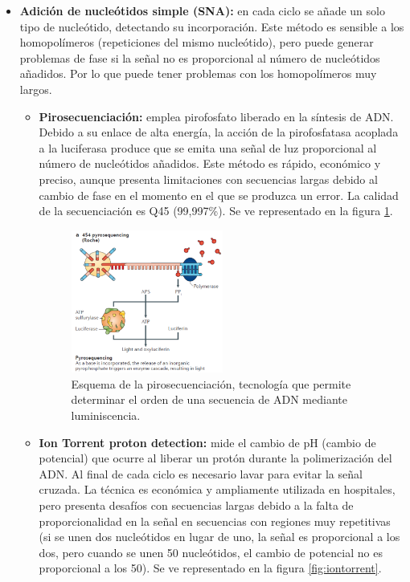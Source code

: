\begin{itemize}
\begin{itemize}
\item \textbf{Adición de nucleótidos simple (SNA):} en cada ciclo se añade un solo tipo de nucleótido, detectando su incorporación. Este método es sensible a los homopolímeros (repeticiones del mismo nucleótido), pero puede generar problemas de fase si la señal no es proporcional al número de nucleótidos añadidos. Por lo que puede tener problemas con los homopolímeros muy largos.
\begin{itemize}
\item \textbf{Pirosecuenciación:} emplea pirofosfato liberado en la síntesis de ADN. Debido a su enlace de alta energía, la acción de la pirofosfatasa acoplada a la luciferasa produce que se emita una señal de luz proporcional al número de nucleótidos añadidos. Este método es rápido, económico y preciso, aunque presenta limitaciones con secuencias largas debido al cambio de fase en el momento en el que se produzca un error. La calidad de la secuenciación es Q45 (99,997\%). Se ve representado en la figura \ref{fig:pirosecuenciacion}.

\begin{figure}[htbp]
\centering
\includegraphics[width = 0.5\textwidth]{figs/pirosecuenciacion.png}
\caption{Esquema de la pirosecuenciación, tecnología que permite determinar el orden de una secuencia de ADN mediante luminiscencia.}
\label{fig:pirosecuenciacion}
\end{figure}

\item \textbf{Ion Torrent proton detection:} mide el cambio de pH (cambio de potencial) que ocurre al liberar un protón durante la polimerización del ADN. Al final de cada ciclo es necesario lavar para evitar la señal cruzada. La técnica es económica y ampliamente utilizada en hospitales, pero presenta desafíos con secuencias largas debido a la falta de proporcionalidad en la señal en secuencias con regiones muy repetitivas (si se unen dos nucleótidos en lugar de uno, la señal es proporcional a los dos, pero cuando se unen 50 nucleótidos, el cambio de potencial no es proporcional a los 50). Se ve representado en la figura \ref{fig:iontorrent}.


\end{itemize}
\end{itemize}
\end{itemize}
